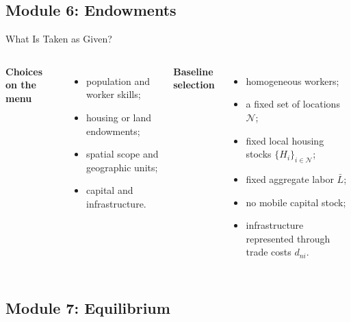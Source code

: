 \documentclass[aspectratio=169,11pt]{beamer}
\newcommand{\B}[1]{\textcolor{blue1}{\textbf{#1}}}
\begin{document}
\subsection{Module 6: Endowments}

\begin{frame}[t]{What Is Taken as Given?}
  \begin{columns}[T,onlytextwidth]
      \B{Choices on the menu}
      \begin{itemize}\setlength{\itemsep}{5pt}
        \item population and worker skills;
        \item housing or land endowments;
        \item spatial scope and geographic units;
        \item capital and infrastructure.
      \end{itemize}

      \B{Baseline selection}
      \begin{itemize}\setlength{\itemsep}{5pt}
        \item homogeneous workers;
        \item a fixed set of locations $\mathcal N$;
        \item fixed local housing stocks \(\{H_i\}_{i\in\mathcal N}\);
        \item fixed aggregate labor $\bar L$;
        \item no mobile capital stock;
        \item infrastructure represented through trade costs $d_{ni}$.
      \end{itemize}
  \end{columns}
\end{frame}

\subsection{Module 7: Equilibrium}
\end{document}

